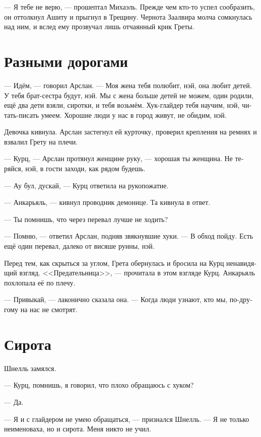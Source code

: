 \documentclass[a4paper,10pt,fleqn]{book}\usepackage{polyglossia}\setdefaultlanguage[babelshorthands=true]{russian}\setotherlanguage{english}\defaultfontfeatures{Ligatures=TeX,Mapping=tex-text}\usepackage{xcolor}\newcommand{\ml}[3]{#2}
\begin{document}
\ml{$0$}
{--- Я тебе не верю, --- прошептал Михаэль.}
{``I don't believe you,'' Michael whispered.}
Прежде чем кто-то успел сообразить, он оттолкнул Ашиту и прыгнул в Трещину.
Чернота Заалвира молча сомкнулась над ним, и вслед ему прозвучал лишь отчаянный крик Греты.

\section{Разными дорогами}

--- Идём, --- говорил Арслан.
--- Моя жена тебя полюбит, нэй, она любит детей.
У тебя брат-сестра будут, нэй.
Мы с жена больше детей не можем, один родили, ещё два дети взяли, сиротки, и тебя возьмём.
Хук-глайдер тебя научим, нэй, читать-писать умеем.
Хорошие люди у нас в город живут, не обидим, нэй.

Девочка кивнула.
Арслан застегнул ей курточку, проверил крепления на ремнях и взвалил Грету на плечи.

--- Курц, --- Арслан протянул женщине руку, --- хорошая ты женщина.
Не теряйся, нэй, в гости заходи, как рядом будешь.

\ml{$0$}
{--- Ау бул, дускай, --- Курц ответила на рукопожатие.}
{``\textit{Au bul, du\th{}k\ae{},}'' Kurz answered the handshake.}

--- Анкарьяль, --- кивнул проводник демонице.
Та кивнула в ответ.

--- Ты помнишь, что через перевал лучше не ходить?

--- Помню, --- ответил Арслан, подняв звякнувшие хуки.
--- В обход пойду.
Есть ещё один перевал, далеко от висяше руины, нэй.

Перед тем, как скрыться за углом, Грета обернулась и бросила на Курц ненавидящий взгляд.
<<Предательница>>, --- прочитала в этом взгляде Курц.
Анкарьяль похлопала её по плечу.

--- Привыкай, --- лаконично сказала она.
--- Когда люди узнают, кто мы, по-другому на нас не смотрят.

\section{Сирота}

Шнелль замялся.

--- Курц, помнишь, я говорил, что плохо обращаюсь с хуком?

--- Да.

--- Я и с глайдером не умею обращаться, --- признался Шнелль.
--- Я не только неименоваха, но и сирота.
Меня никто не учил.
\end{document}
